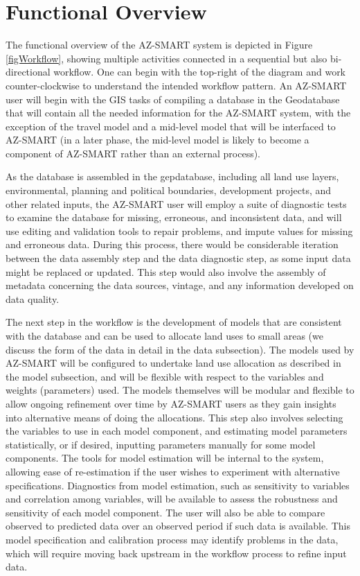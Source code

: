  \section{Functional Overview}
The functional overview of the AZ-SMART system is depicted in Figure \ref{figWorkflow}, showing multiple activities connected in a
sequential but also bi-directional workflow.  One can begin with the top-right of the diagram and work counter-clockwise to
understand the intended workflow pattern.  An AZ-SMART user will begin with the GIS tasks of compiling a database in the Geodatabase
that will contain all the needed information for the AZ-SMART system, with the exception of the travel model and a mid-level model
that will be interfaced to AZ-SMART (in a later phase, the mid-level model is likely to become a component of AZ-SMART rather than
an external process).

As the database is assembled in the gepdatabase, including all land use layers, environmental, planning and political boundaries,
development projects, and other related inputs, the AZ-SMART user will employ a suite of diagnostic tests to examine the database
for missing, erroneous, and inconsistent data, and will use editing and validation tools to repair problems, and impute values for
missing and erroneous data.  During this process, there would be considerable iteration between the data assembly step and the data
diagnostic step, as some input data might be replaced or updated.  This step would also involve the assembly of metadata concerning
the data sources, vintage, and any information developed on data quality.

The next step in the workflow is the development of models that are consistent with the database and can be used to allocate land
uses to small areas (we discuss the form of the data in detail in the data subsection).  The models used by AZ-SMART will be configured
to undertake land use allocation as described in the model subsection, and will be flexible with respect to the variables and weights
(parameters) used.  The models themselves will be modular and flexible to allow ongoing refinement over time by AZ-SMART users as they
gain insights into alternative means of doing the allocations.  This step also involves selecting the variables to use in each model
component, and estimating model parameters statistically, or if desired, inputting parameters manually for some model components.
The tools for model estimation will be internal to the system, allowing ease of re-estimation if the user wishes to experiment with
alternative specifications.  Diagnostics from model estimation, such as sensitivity to variables and correlation among variables,
will be available to assess the robustness and sensitivity of each model component.  The user will also be able to compare observed
to predicted data over an observed period if such data is available.  This model specification and calibration process may identify
problems in the data, which will require moving back upstream in the workflow process to refine input data.

